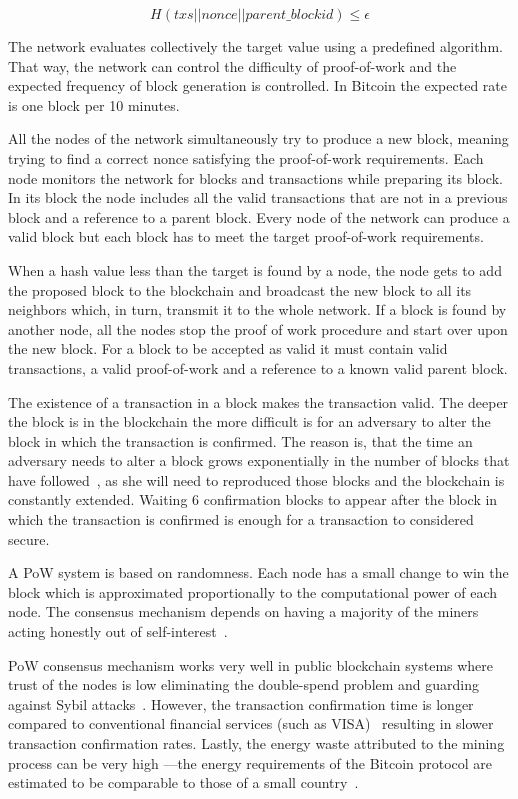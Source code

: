\begin{equation*}
  H(txs || nonce || parent\_blockid) \leq \epsilon
\end{equation*}

The network evaluates collectively the target value using a predefined algorithm. That way, the network can control the difficulty of proof-of-work and the expected frequency of block generation is controlled. In Bitcoin the expected rate is one block per 10 minutes.

All the nodes of the network simultaneously try to produce a new block, meaning trying to find a correct nonce satisfying the proof-of-work requirements. Each node monitors the network for blocks and transactions while preparing its block. In its block the node includes all the valid transactions that are not in a previous block and a reference to a parent block. Every node of the network can produce a valid block but each block has to meet the target proof-of-work requirements.

When a hash value less than the target is found by a node, the node gets to add the proposed block to the blockchain and broadcast the new block to all its neighbors which, in turn, transmit it to the whole network. If a block is found by another node, all the nodes stop the proof of work procedure and start over upon the new block. For a block to be accepted as valid it must contain valid transactions, a valid proof-of-work and a reference to a known valid parent block.

The existence of a transaction in a block makes the transaction valid. The deeper the block is in the blockchain the more difficult is for an adversary to alter the block in which the transaction is confirmed. The reason is, that the time an adversary needs to alter a block grows exponentially in the number of blocks that have followed~\cite{10.1007/978-3-662-46803-6_10}, as she will need to reproduced those blocks and the blockchain is constantly extended. Waiting 6 confirmation blocks to appear after the block in which the transaction is confirmed is enough for a transaction to considered secure.

A PoW system is based on randomness. Each node has a small change to win the block which is approximated proportionally to the computational power of each node. The consensus mechanism depends on having a majority of the miners acting honestly out of self-interest~\cite{antonopoulos2014mastering}.

PoW consensus mechanism works very well in public blockchain systems where trust of the nodes is low eliminating the double-spend problem and guarding against Sybil attacks~\cite{Vu:2009:PCP:1671222}. However, the transaction confirmation time is longer compared to conventional financial services (such as VISA)~\cite{Sompolinsky2015,Zohar:2015:BUH:2817191.2701411,DBLP:journals/corr/abs-1708-05665} resulting in slower transaction confirmation rates. Lastly, the energy waste attributed to the mining process can be very high ---the energy requirements of the Bitcoin protocol are estimated to be comparable to those of a small country~\cite{6912770}.

